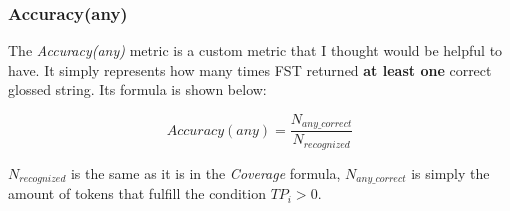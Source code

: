 \FloatBarrier
\subsubsection*{Accuracy(any)}
The \textit{Accuracy(any)} metric is a custom metric that I thought would be helpful to have. It simply represents how many times FST returned \textbf{at least one} correct glossed string. Its formula is shown below:

\[Accuracy(any) = \frac{N_{any\_correct}}{N_{recognized}}\]

$N_{recognized}$ is the same as it is in the \textit{Coverage} formula, $N_{any\_correct}$ is simply the amount of tokens that fulfill the condition $TP_i>0$.

\FloatBarrier
